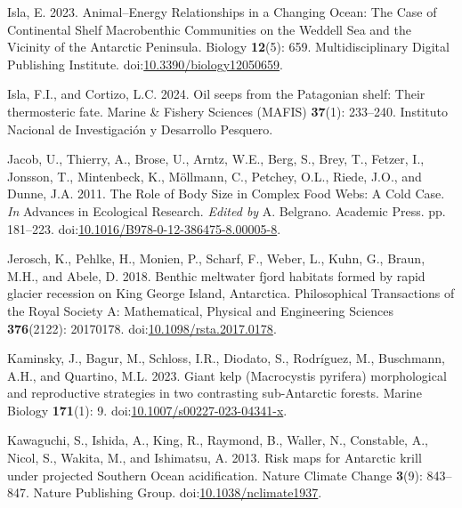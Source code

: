 \documentclass[
]{article}
\newlength{\cslhangindent}
\newenvironment{CSLReferences}[2] %
 {\begin{list}{}{%
  \setlength{\itemindent}{0pt}
  \setlength{\leftmargin}{0pt}
  \setlength{\parsep}{0pt}
  \ifodd #1
   \setlength{\leftmargin}{\cslhangindent}
   \setlength{\itemindent}{-1\cslhangindent}
  \fi
  \setlength{\itemsep}{#2\baselineskip}}}
 {\end{list}}
\begin{document}
\begin{CSLReferences}{1}{0}
Isla, E. 2023. Animal--{Energy Relationships} in a {Changing Ocean}:
{The Case} of {Continental Shelf Macrobenthic Communities} on the
{Weddell Sea} and the {Vicinity} of the {Antarctic Peninsula}. Biology
\textbf{12}(5): 659. Multidisciplinary Digital Publishing Institute.
doi:\href{https://doi.org/10.3390/biology12050659}{10.3390/biology12050659}.

Isla, F.I., and Cortizo, L.C. 2024. Oil seeps from the {Patagonian}
shelf: Their thermosteric fate. Marine \& Fishery Sciences (MAFIS)
\textbf{37}(1): 233--240. Instituto Nacional de Investigaci{ó}n y
Desarrollo Pesquero.

Jacob, U., Thierry, A., Brose, U., Arntz, W.E., Berg, S., Brey, T.,
Fetzer, I., Jonsson, T., Mintenbeck, K., Möllmann, C., Petchey, O.L.,
Riede, J.O., and Dunne, J.A. 2011. The {Role} of {Body Size} in {Complex
Food Webs}: {A Cold Case}. \emph{In} Advances in {Ecological Research}.
\emph{Edited by} A. Belgrano. Academic Press. pp. 181--223.
doi:\href{https://doi.org/10.1016/B978-0-12-386475-8.00005-8}{10.1016/B978-0-12-386475-8.00005-8}.

Jerosch, K., Pehlke, H., Monien, P., Scharf, F., Weber, L., Kuhn, G.,
Braun, M.H., and Abele, D. 2018. Benthic meltwater fjord habitats formed
by rapid glacier recession on {King George Island}, {Antarctica}.
Philosophical Transactions of the Royal Society A: Mathematical,
Physical and Engineering Sciences \textbf{376}(2122): 20170178.
doi:\href{https://doi.org/10.1098/rsta.2017.0178}{10.1098/rsta.2017.0178}.

Kaminsky, J., Bagur, M., Schloss, I.R., Diodato, S., Rodríguez, M.,
Buschmann, A.H., and Quartino, M.L. 2023. Giant kelp ({Macrocystis}
pyrifera) morphological and reproductive strategies in two contrasting
sub-{Antarctic} forests. Marine Biology \textbf{171}(1): 9.
doi:\href{https://doi.org/10.1007/s00227-023-04341-x}{10.1007/s00227-023-04341-x}.

Kawaguchi, S., Ishida, A., King, R., Raymond, B., Waller, N., Constable,
A., Nicol, S., Wakita, M., and Ishimatsu, A. 2013. Risk maps for
{Antarctic} krill under projected {Southern Ocean} acidification. Nature
Climate Change \textbf{3}(9): 843--847. Nature Publishing Group.
doi:\href{https://doi.org/10.1038/nclimate1937}{10.1038/nclimate1937}.


\end{CSLReferences}
\end{document}
